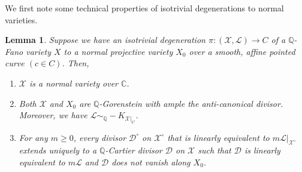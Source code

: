 \documentclass[11pt,reqno]{amsart}
\newcommand{\C}{\mathbb{C}}
\newcommand{\Q}{\mathbb{Q}}
\newcommand{\cD}{\mathcal{D}}
\newcommand{\cL}{\mathcal{L}}
\newcommand{\cX}{\mathcal{X}}
\numberwithin{equation}{section}
\newtheorem{lem}[prop] {Lemma}
\theoremstyle{definition}
\begin{document}
We first note some technical properties of isotrivial degenerations to normal varieties. 
\begin{lem} \label{propertiesofisotriv}
Suppose we have an isotrivial degeneration $\pi: (\cX, \cL) \to C$ of a $\Q$-Fano variety $X$ to a normal projective variety $X_{0}$ over a smooth, affine pointed curve $(c \in C)$. Then,
\begin{enumerate}
    \item $\cX$ is a normal variety over $\C$.
    \item Both $\cX$ and $X_{0}$ are $\Q$-Gorenstein with ample the anti-canonical divisor. Moreover, we have $\cL \sim_\Q -K_{\cX|_C}$.
    \item For any $m \geq 0$, every divisor $\cD^{\circ}$ on $\cX^{\circ}$ that is linearly equivalent to $m\cL|_{\cX^{\circ}}$ extends uniquely to a $\Q$-Cartier divisor $\cD$ on $\cX$ such that $\cD$ is linearly equivalent to $m\cL$ and $\cD$ does not vanish along $X_0$.
    
\end{enumerate}
\end{lem}
\end{document}
